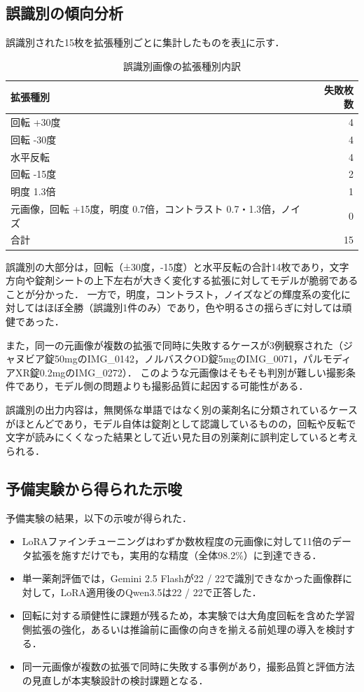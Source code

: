 \documentclass{jsarticle}
\begin{document}
\subsection{誤識別の傾向分析}

誤識別された15枚を拡張種別ごとに集計したものを表\ref{tab:failed_aug}に示す．

\begin{table}[h]
\centering
\caption{誤識別画像の拡張種別内訳}
\label{tab:failed_aug}
\begin{tabular}{lr}
\hline
拡張種別 & 失敗枚数 \\
\hline
回転 +30度 & 4 \\
回転 -30度 & 4 \\
水平反転 & 4 \\
回転 -15度 & 2 \\
明度 1.3倍 & 1 \\
元画像，回転 +15度，明度 0.7倍，コントラスト 0.7・1.3倍，ノイズ & 0 \\
\hline
合計 & 15 \\
\hline
\end{tabular}
\end{table}

誤識別の大部分は，回転（±30度，-15度）と水平反転の合計14枚であり，文字方向や錠剤シートの上下左右が大きく変化する拡張に対してモデルが脆弱であることが分かった．
一方で，明度，コントラスト，ノイズなどの輝度系の変化に対してはほぼ全勝（誤識別1件のみ）であり，色や明るさの揺らぎに対しては頑健であった．

また，同一の元画像が複数の拡張で同時に失敗するケースが3例観察された（ジャヌビア錠50mgのIMG\_0142，ノルバスクOD錠5mgのIMG\_0071，パルモディアXR錠0.2mgのIMG\_0272）．
このような元画像はそもそも判別が難しい撮影条件であり，モデル側の問題よりも撮影品質に起因する可能性がある．

誤識別の出力内容は，無関係な単語ではなく別の薬剤名に分類されているケースがほとんどであり，モデル自体は錠剤として認識しているものの，回転や反転で文字が読みにくくなった結果として近い見た目の別薬剤に誤判定していると考えられる．

\subsection{予備実験から得られた示唆}

予備実験の結果，以下の示唆が得られた．

\begin{itemize}
  \item LoRAファインチューニングはわずか数枚程度の元画像に対して11倍のデータ拡張を施すだけでも，実用的な精度（全体98.2\%）に到達できる．
  \item 単一薬剤評価では，Gemini 2.5 Flashが22 / 22で識別できなかった画像群に対して，LoRA適用後のQwen3.5は22 / 22で正答した．
  \item 回転に対する頑健性に課題が残るため，本実験では大角度回転を含めた学習側拡張の強化，あるいは推論前に画像の向きを揃える前処理の導入を検討する．
  \item 同一元画像が複数の拡張で同時に失敗する事例があり，撮影品質と評価方法の見直しが本実験設計の検討課題となる．
\end{itemize}
\end{document}
